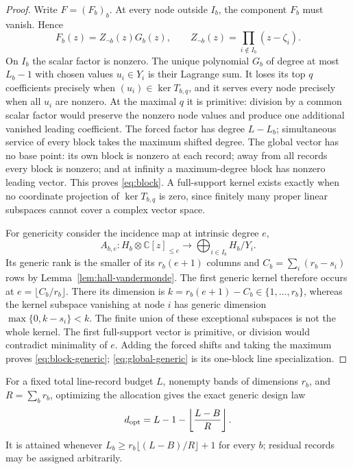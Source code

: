 \documentclass[11pt]{article}
\theoremstyle{definition}\newtheorem{definition}[theorem]{Definition}\newtheorem{example}[theorem]{Example}
\theoremstyle{remark}\newtheorem{remark}[theorem]{Remark}\newtheorem{limitation}[theorem]{Limitation}
\newcommand{\C}{\mathbb C}\newcommand{\D}{\mathbb D}\newcommand{\T}{\mathbb T}
\begin{document}
\begin{proof}
Write $F=(F_b)_b$.  At every node outside $I_b$, the component $F_b$ must
vanish.  Hence
\[
 F_b(z)=Z_{\neg b}(z)G_b(z),\qquad
 Z_{\neg b}(z)=\prod_{i\notin I_b}(z-\zeta_i).
\]
On $I_b$ the scalar factor is nonzero.  The unique polynomial $G_b$ of degree
at most $L_b-1$ with chosen values $u_i\in Y_i$ is their Lagrange sum.  It
loses its top $q$ coefficients precisely when $(u_i)\in\ker T_{b,q}$, and it
serves every node precisely when all $u_i$ are nonzero.  At the maximal $q$
it is primitive: division by a common scalar factor would preserve the
nonzero node values and produce one additional vanished leading coefficient.
The forced factor has degree $L-L_b$; simultaneous service of every block
takes the maximum shifted degree.  The global vector has no base point: its
own block is nonzero at each record; away from all records every block is
nonzero; and at infinity a maximum-degree block has nonzero leading vector.
This proves \eqref{eq:block}.  A full-support
kernel exists exactly when no coordinate projection of $\ker T_{b,q}$ is
zero, since finitely many proper linear subspaces cannot cover a complex
vector space.

For genericity consider the incidence map at intrinsic degree $e$,
\[
 A_{b,e}:H_b\otimes\C[z]_{\le e}\longrightarrow
                \bigoplus_{i\in I_b}H_b/Y_i.
\]
Its generic rank is the smaller of its $r_b(e+1)$ columns and
$C_b=\sum_i(r_b-s_i)$ rows by Lemma~\ref{lem:hall-vandermonde}.  The first generic kernel therefore occurs at
$e=\lfloor C_b/r_b\rfloor$.  There its dimension is
$k=r_b(e+1)-C_b\in\{1,\ldots,r_b\}$, whereas the kernel subspace vanishing at
node $i$ has generic dimension $\max\{0,k-s_i\}<k$.  The finite
union of these exceptional subspaces is not the whole kernel.  The first
full-support vector is primitive, or division would contradict minimality of
$e$.  Adding the forced shifts and taking the maximum proves
\eqref{eq:block-generic}; \eqref{eq:global-generic} is its one-block line
specialization.
\end{proof}

For a fixed total line-record budget $L$, nonempty bands of dimensions $r_b$,
and $R=\sum_b r_b$, optimizing the allocation gives the exact generic design
law
\begin{equation}\label{eq:allocation}
 d_{\rm opt}=L-1-\left\lfloor\frac{L-B}{R}\right\rfloor.
\end{equation}
It is attained whenever
$L_b\ge r_b\lfloor(L-B)/R\rfloor+1$ for every $b$; residual records may be
assigned arbitrarily.
\end{document}
